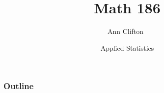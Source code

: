 \documentclass{beamer}
\title %
    {Math 186}
\author[Clifton]
{Ann Clifton~\inst{1}}
\institute[USC]{
\inst{1}
Lafayette College}
\date[January 17, 2017]
{Applied Statistics}
\theoremstyle{definition}
\begin{document}
\begin{frame}
  \titlepage
\end{frame}

\begin{frame}
  \frametitle{Outline}
  \tableofcontents[pausesections]
\end{frame}





\end{document}
